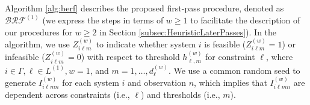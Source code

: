 \documentclass[11pt]{article}
\begin{document}
Algorithm \ref{alg:berf} describes the proposed first-pass procedure, denoted as $\mathcal{BRF}^{(1)}$ (we express the steps in terms of $w\geq 1$ to facilitate the description of our procedures for $w\geq 2$ in Section \ref{subsec:HeuristicLaterPasses}). In the algorithm, we use $Z_{i\ell m}^{(w)}$ to indicate whether system $i$ is feasible ($Z_{i\ell m}^{(w)}=1$) or infeasible ($Z_{i\ell m}^{(w)}=0$) with respect to threshold $h_{\ell, m}^{(w)}$ for constraint $\ell$, where $ i\in \Gamma, \ell\in L^{(1)}, w=1$, and $m=1, \ldots, d_\ell^{(w)}$. 
We use a common random seed to generate $I_{i\ell mn}^{(w)}$ for each system $i$ and observation $n$, which implies that $I_{i\ell mn}^{(w)}$ are dependent across constraints (i.e., $\ell$) and thresholds (i.e., $m$).
\end{document}
